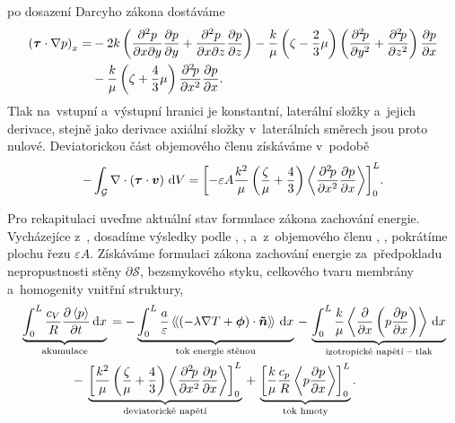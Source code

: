 po dosazení Darcyho zákona dostáváme
\begin{align}
    \left(\bm{\tau}\cdot \nabla p\right)_x=
    &-2k\left(\frac{\partial^2 p}{\partial x \partial y}\frac{\partial p}{\partial y}+\frac{\partial^2 p}{\partial x \partial z}\frac{\partial p}{\partial z}\right)-\frac{k}{\mu}\left(\zeta-\frac{2}{3}\mu\right)\left(\frac{\partial^2 \! p}{\partial y^2}+\frac{\partial^2 \! p}{\partial z^2}\right)\frac{\partial p}{\partial x}\nonumber\\
    &-\frac{k}{\mu}\left(\zeta+\frac{4}{3}\mu\right)\frac{\partial^2 \! p}{\partial x^2}\frac{\partial p}{\partial x}
    .
\end{align}
Tlak na~vstupní a~výstupní hranici je konstantní, laterální složky a~jejich derivace, stejně jako derivace axiální složky v~laterálních směrech jsou proto nulové. Deviatorickou část objemového členu získáváme v~podobě
\begin{equation}\label{eq:deviatoric_mean}
    -\int_{\mathcal{G}}\nabla\cdot\left(\bm{\tau}\cdot \bm{v}\right) \,\mathrm{d}{V}=
    {\left[- \varepsilon A \frac{k^2}{\mu}\left(\frac{\zeta}{\mu}+\frac{4}{3}\right)\left\langle\frac{\partial^2 \! p}{\partial x^2}\frac{\partial p}{\partial x}\right\rangle \right]}_0^L.
\end{equation}

Pro rekapitulaci uveďme aktuální stav formulace zákona zachování energie. Vycházejíce z~, dosadíme výsledky podle , ,  a~z~objemového členu , , pokrátíme plochu řezu $\varepsilon A$. Získáváme formulaci zákona zachování energie za~předpokladu nepropustnosti stěny $\partial\mathcal{S}$, bezsmykového styku, celkového tvaru membrány a~homogenity vnitřní struktury,
\begin{align}\label{eq:model_1D_integral}
    &\underbrace{\int_0^L\frac{c_V}{R}\frac{\partial \left\langle p\right\rangle}{\partial t}\,\mathrm{d}{x}}_{\text{akumulace}}\,=
    -\underbrace{\int_0^L \frac{a}{\varepsilon} \left\langle\!\left\langle \left(-\lambda \nabla T + \bm{\phi}\right)\cdot\bm{\tilde{n}} \right\rangle\!\right\rangle\,\mathrm{d}{x}}_{\text{tok energie stěnou}}
    \,-\, \underbrace{\int_0^L \frac{k}{\mu}\left\langle \frac{\partial }{\partial x}\left(p\frac{\partial p}{\partial x}\right)\right\rangle \,\mathrm{d}{x}}_{\text{izotropické napětí -- tlak}}
    \nonumber\\ & \qquad\qquad
    -\,\underbrace{\vphantom{\int_0^L}{\left[\frac{k^2}{\mu}\left(\frac{\zeta}{\mu}+\frac{4}{3}\right)\left\langle\frac{\partial^2 \! p}{\partial x^2}\frac{\partial p}{\partial x}\right\rangle \right]}_0^L}_{\text{deviatorické napětí}}
    \,+\, \underbrace{\vphantom{\int_0^L}{\left[\frac{k}{\mu}\frac{c_p}{R}\left\langle p\frac{\partial p}{\partial x}\right\rangle\right]}_0^L}_{\text{tok hmoty}}.
\end{align}

